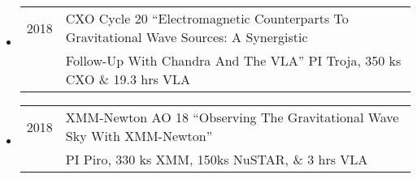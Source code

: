 \begin{itemize}
\begin{tabular}{ll}
\end{tabular}
\item \begin{tabular}{ll}
2018	& CXO Cycle 20 ``Electromagnetic Counterparts To Gravitational Wave Sources: A Synergistic\\
	&  Follow-Up With Chandra And The VLA'' PI Troja, 350 ks CXO \& 19.3 hrs VLA
\end{tabular}
\item \begin{tabular}{ll}
2018	& XMM-Newton AO 18  ``Observing The Gravitational Wave Sky With XMM-Newton''\\
	&  PI Piro, 330 ks XMM, 150ks NuSTAR, \& 3 hrs VLA
\end{tabular}
\end{itemize}

